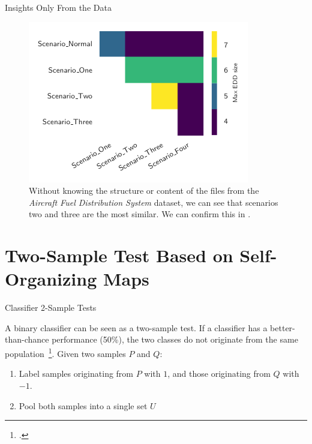 \documentclass[10pt,compress]{beamer}
\begin{document}
\begin{frame}{Insights Only From the Data}
\begin{figure}
    \centering
    \includegraphics[width=.6\textwidth]{aircraft-cross}
    \caption{
        Without knowing the structure or content of the files from the \emph{Aircraft Fuel Distribution System}
        dataset, we can see that scenarios two and three are the most similar. We can confirm this in
        \cite{Gheraibia2019}.
    }
\end{figure}
\end{frame}

\section{Two-Sample Test Based on Self-Organizing Maps}


\begin{frame}{Classifier 2-Sample Tests}
    \begin{block}{}
        A binary classifier can be seen as a two-sample test.
        If a classifier has a better-than-chance performance (50\%), the two classes do not originate from the same
        population~\footcite{friedman2004multivariate}.
        \smallskip
        Given two samples $P$ and $Q$:
        \begin{enumerate}
            \item Label samples originating from $P$ with $1$, and those originating from $Q$ with $-1$.
            \item Pool both samples into a single set $U$
        \end{enumerate}
    \end{block}
\end{frame}
\end{document}
